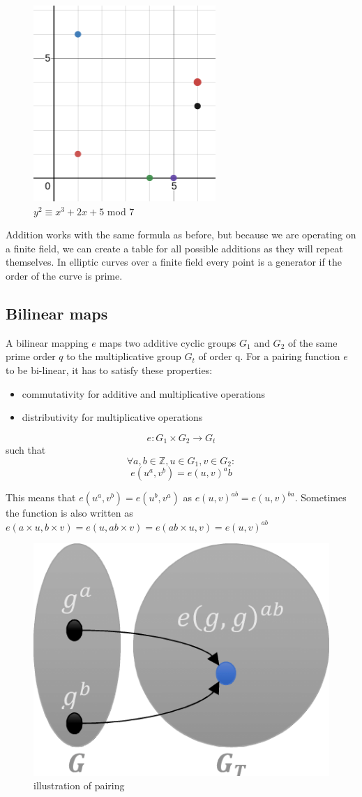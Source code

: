 \documentclass[a4paper,12pt]{scrartcl}
\begin{document}
\begin{figure}[hbt!]
	\centering
	\includegraphics[width=0.5\linewidth]{ec3}
	\caption{$y^2 \equiv x^3 + 2x + 5$ mod $7$}
\end{figure}

Addition works with the same formula as before, but because we are operating on a finite field, we can create a table for all possible additions as they will repeat themselves. In elliptic curves over a finite field every point is a generator if the order of the curve is prime.

\subsection{Bilinear maps}
A bilinear mapping $e$ maps two additive cyclic groups $G_1$ and $G_2$ of the same prime order $q$ to the multiplicative group $G_t$ of order q. For a pairing function $e$ to be bi-linear, it has to satisfy these properties:
\begin{itemize}
	\item commutativity for additive and multiplicative operations
	\item distributivity for multiplicative operations
\end{itemize}
\[ e: G_1 \times G_2 \rightarrow G_t \]
such that
\[ \forall a,b \in \mathbb{Z}, u \in G_1, v \in G_2: \]
\[ e(u^a,v^b) = e(u,v)^ab \]

This means that $e(u^a,v^b) = e(u^b,v^a)$ as $e(u,v)^{ab} = e(u,v)^{ba}$.
Sometimes the function is also written as $e(a\times{u},b\times{v}) = e(u,ab\times{v}) = e(ab\times{u},v) = e(u,v)^{ab}$

\begin{figure}[hbt!]
	\centering
	\includegraphics[width=0.5\linewidth]{pairing1}
	\caption{illustration of pairing}
\end{figure}
\end{document}
